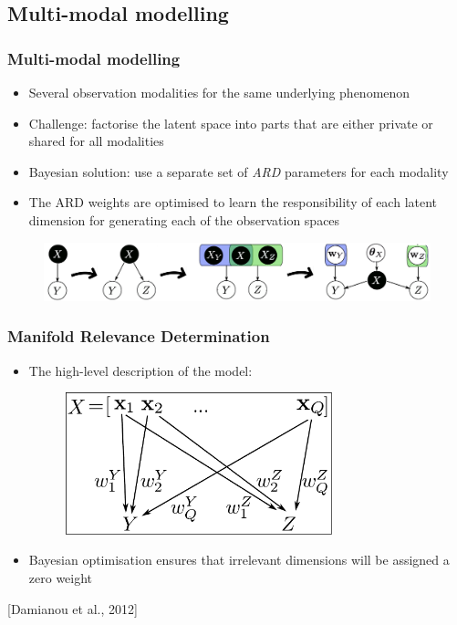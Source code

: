 \documentclass{beamer}
\begin{document}
\subsection{Multi-modal modelling}
\begin{frame}
	\frametitle{Multi-modal modelling}
    \begin{itemize}
       \item Several observation modalities for the same underlying phenomenon
        \vspace{3pt}
      \item \alert{Challenge}: factorise the latent space into parts that are either private or shared for all modalities
       \vspace{3pt}
     \item \alert{Bayesian solution}: use a separate set of \emph{ARD} parameters for each modality
        \vspace{3pt}
    \item The ARD weights are optimised to learn the responsibility of each latent dimension for generating each of the observation spaces
    \end{itemize}
      \begin{figure}
      \begin{center}
	  \includegraphics[width=1.05\textwidth]{graphicalmodel.png}
    \end{center}
    \end{figure}
\end{frame}

\begin{frame}
\frametitle{Manifold Relevance Determination}
\begin{itemize}
\item The high-level description of the model:
\begin{figure}
\begin{center}
{
        \includegraphics[width=0.73\textwidth]{modelWeights}
}
\end{center}
\end{figure}

\item Bayesian optimisation ensures that irrelevant dimensions will be assigned a zero weight
\end{itemize}
\begin{flushright}
\small{
[Damianou et al., 2012]
}
\end{flushright}
\end{frame}
\end{document}
